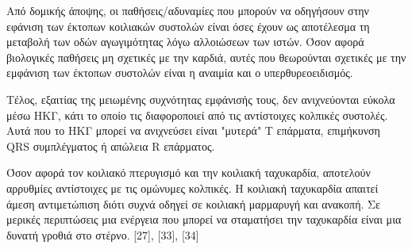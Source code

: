 \begin{itemize}
	\par
	Από δομικής άποψης, οι παθήσεις/αδυναμίες που μπορούν να οδηγήσουν στην εφάνιση των έκτοπων κοιλιακών συστολών είναι όσες έχουν ως αποτέλεσμα τη μεταβολή των οδών αγωγιμότητας λόγω αλλοιώσεων των ιστών. Όσον αφορά βιολογικές παθήσεις μη σχετικές με την καρδιά, αυτές που θεωρούνται σχετικές με την εμφάνιση των έκτοπων συστολών είναι η αναιμία και ο υπερθυρεοειδισμός.
	\par 
	Τέλος, εξαιτίας της μειωμένης συχνότητας εμφάνισής τους, δεν ανιχνεύονται εύκολα μέσω ΗΚΓ, κάτι το οποίο τις διαφοροποιεί από τις αντίστοιχες κολπικές συστολές. Αυτά που το ΗΚΓ μπορεί να ανιχνεύσει είναι "μυτερά" Τ επάρματα, επιμήκυνση \en QRS \gr συμπλέγματος ή απώλεια \en R \gr επάρματος.
	
	Όσον αφορά τον κοιλιακό πτερυγισμό και την κοιλιακή ταχυκαρδία, αποτελούν αρρυθμίες αντίστοιχες με τις ομώνυμες κολπικές. Η κοιλιακή ταχυκαρδία απαιτεί άμεση αντιμετώπιση διότι συχνά οδηγεί σε κοιλιακή μαρμαρυγή και ανακοπή. Σε μερικές περιπτώσεις μια ενέργεια που μπορεί να σταματήσει την ταχυκαρδία είναι μια δυνατή γροθιά στο στέρνο. [27], [33], [34]
	

\end{itemize}
